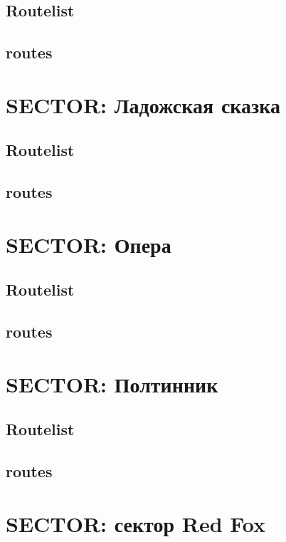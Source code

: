 \documentclass[8pt, a4paper,notitlepage,openany]{report}
\begin{document}
\section*{Routelist}

\newpage
\section*{routes}





\chapter{SECTOR: Ладожская сказка}
\section*{Routelist}

\newpage
\section*{routes}


\chapter{SECTOR: Опера}
\section*{Routelist}

\newpage
\section*{routes}





\chapter{SECTOR: Полтинник}
\section*{Routelist}

\newpage
\section*{routes}


\chapter{SECTOR: сектор Red Fox}
\end{document}
